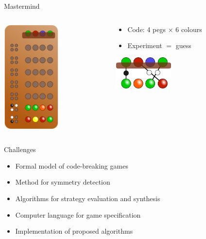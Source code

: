 \documentclass{beamer}
\begin{document}
\begin{frame}{Mastermind}
\begin{columns}
 \begin{column}{.35\textwidth}
 \centering
 \includegraphics[width=3cm]{../pictures/mastermind.png}
 \end{column}

 \begin{column}{.6\textwidth}
  \begin{itemize}
  \item Code: 4 pegs $\times$ 6 colours
  \item Experiment $=$ guess
  \end{itemize}
  \begin{center}
  \includegraphics[width=3cm]{../pictures/mastermind-matching.png}
  \end{center}
 \end{column}
\end{columns}
\end{frame}

\begin{frame}{Challenges}
\begin{itemize}
\item Formal model of code-breaking games
\item Method for symmetry detection
\item Algorithms for strategy evaluation and synthesis
\item Computer language for game specification
\item Implementation of proposed algorithms
\end{itemize}
\end{frame}
\end{document}
